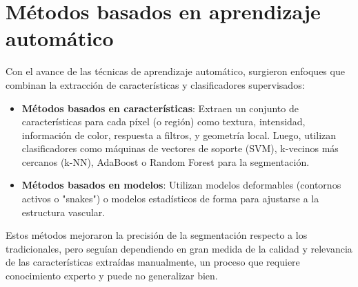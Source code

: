 \documentclass[11pt,a4paper]{report} %
\begin{document}
\section{Métodos basados en aprendizaje automático}
Con el avance de las técnicas de aprendizaje automático, surgieron enfoques que combinan la extracción de características y clasificadores supervisados:
\begin{itemize}
  \item \textbf{Métodos basados en características}: Extraen un conjunto de características para cada píxel (o región) como textura, intensidad, información de color, respuesta a filtros, y geometría local. Luego, utilizan clasificadores como máquinas de vectores de soporte (SVM), k-vecinos más cercanos (k-NN), AdaBoost o Random Forest para la segmentación.
  \item \textbf{Métodos basados en modelos}: Utilizan modelos deformables (contornos activos o "snakes") o modelos estadísticos de forma para ajustarse a la estructura vascular.
\end{itemize}
Estos métodos mejoraron la precisión de la segmentación respecto a los tradicionales, pero seguían dependiendo en gran medida de la calidad y relevancia de las características extraídas manualmente, un proceso que requiere conocimiento experto y puede no generalizar bien.
\end{document}

